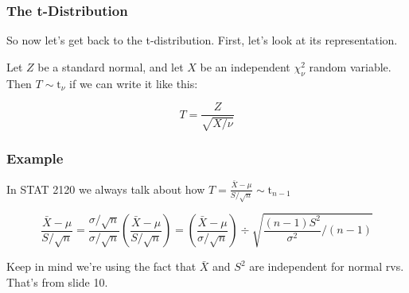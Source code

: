 \documentclass{beamer}
\begin{document}

% 
% 
% 


\begin{frame}
\frametitle{The t-Distribution}

So now let's get back to the t-distribution. First, let's look at its representation. 
\newline

Let $Z$ be a standard normal, and let $X$ be an independent $\chi^2_{\nu}$ random variable. Then $T \sim \text{t}_{\nu}$ if we can write it like this:

\[
T = \frac{Z}{\sqrt{X/\nu}}
\]

\end{frame}

\begin{frame}
\frametitle{Example}

In STAT 2120 we always talk about how $T = \frac{\bar{X}- \mu}{S/\sqrt{n}} \sim \text{t}_{n-1}$
\newline

\[
\frac{\bar{X}- \mu}{S/\sqrt{n}} = \frac{\sigma/\sqrt{n}}{\sigma/\sqrt{n}} \left( \frac{\bar{X}- \mu}{S/\sqrt{n}} \right) = 
\left(\frac{\bar{X} - \mu}{\sigma/\sqrt{n}}\right) \div \sqrt{\frac{(n-1)S^2}{\sigma^2} / (n-1)}
\]

Keep in mind we're using the fact that $\bar{X}$ and $S^2$ are independent for normal rvs. That's from slide 10.
\end{frame}
\end{document}
